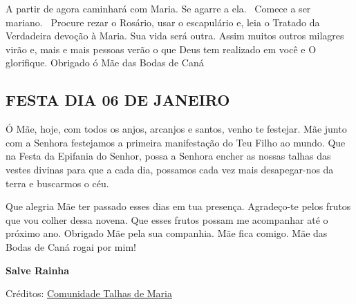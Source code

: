 \documentclass[11pt]{article}
\begin{document}
A partir de agora caminhará com Maria. Se agarre a ela.  Comece a ser mariano.  Procure rezar o Rosário, usar o escapulário e, leia o Tratado da Verdadeira devoção à Maria. Sua vida será outra. Assim muitos outros milagres virão e, mais e mais pessoas verão o que Deus tem realizado em você e O glorifique. Obrigado ó Mãe das Bodas de Caná

\subsection{FESTA DIA 06 DE JANEIRO}
Ó Mãe, hoje, com todos os anjos, arcanjos e santos, venho te festejar. Mãe junto com a Senhora festejamos a primeira manifestação do Teu Filho ao mundo. Que na Festa da Epifania do Senhor, possa a Senhora encher as nossas talhas das vestes divinas para que a cada dia, possamos cada vez mais desapegar-nos da terra e buscarmos o céu.

Que alegria Mãe ter passado esses dias em tua presença. Agradeço-te pelos frutos que vou colher dessa novena. Que esses frutos possam me acompanhar até o próximo ano. Obrigado Mãe pela sua companhia. Mãe fica comigo. Mãe das Bodas de Caná rogai por mim!

\textbf{Salve Rainha}

\vfill 
Créditos: \href{https://talhasdemaria.wixsite.com/comunidade/novena}{Comunidade Talhas de Maria}
\end{document}
